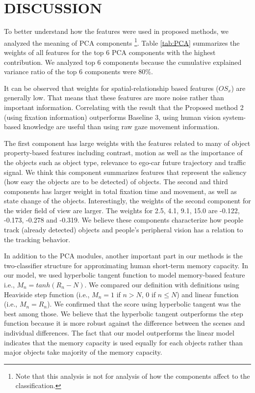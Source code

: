 \documentclass[letterpaper, 10 pt, conference]{ieeeconf}  %
\begin{document}
\section{DISCUSSION}

To better understand how the features were used in proposed methods, we analyzed the meaning of PCA components \footnote{Note that this analysis is not for analysis of how the components affect to the classification.}. Table \ref{tab:PCA} summarizes the weights of all features for the top 6 PCA components with the highest contribution. We analyzed top 6 components because the cumulative explained variance ratio of the top 6 components were 80\%. 

It can be observed that weights for spatial-relationship based features ($OS_x$) are generally low. That means that these features are more noise rather than important information. Correlating with the result that the Proposed method 2 (using fixation information) outperforms Baseline 3, using human vision system-based knowledge are useful than using raw gaze movement information.

The first component has large weights with the features related to many of object property-based features including contrast, motion as well as the importance of the objects such as object type, relevance to ego-car future trajectory and traffic signal. We think this component summarizes features that represent the saliency (how easy the objects are to be detected) of objects. The second and third components has larger weight in total fixation time and movement, as well as state change of the objects. Interestingly, the weights of the second component for the wider field of view are larger. The weights for 2.5, 4.1, 9.1, 15.0 are -0.122, -0.173, -0.278 and -0.319. We believe these components characterize how people track (already detected) objects and people's peripheral vision has a relation to the tracking behavior.

In addition to the PCA modules, another important part in our methods is the two-classifier structure for approximating human short-term memory capacity. In our model, we used hyperbolic tangent function to model memory-based feature i.e., $M_n=tanh(R_n - N)$. We compared our definition with definitions using Heaviside step function (i.e., $M_n=1$ if $n>N$, $0$ if $n\leq N$) and linear function (i.e., $M_n=R_n$). We confirmed that the score using hyperbolic tangent was the best among those. We believe that the hyperbolic tangent outperforms the step function because it is more robust against the difference between the scenes and individual differences. The fact that our model outperforms the linear model indicates that the memory capacity is used equally for each objects rather than major objects take majority of the memory capacity.
\end{document}
